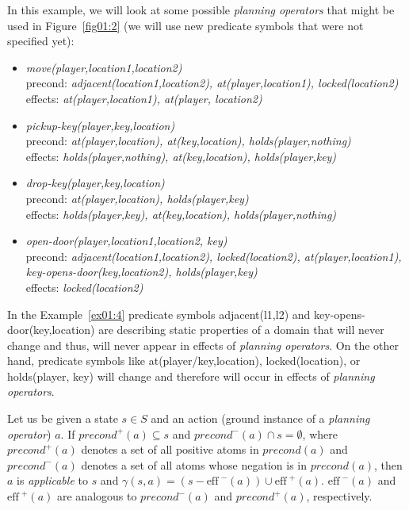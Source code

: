 \begin{example}\label{ex01:4}
    In this example, we will look at some possible \emph{planning operators} that might be used in Figure~\ref{fig01:2} (we will use new predicate symbols that were not specified yet):

    \begin{itemize}
        \item \emph{move(player,location1,location2)} \\
        precond: \emph{adjacent(location1,location2), at(player,location1), \neg locked(location2)} \\
        effects: \emph{\neg at(player,location1), at(player, location2)}

        \item \emph{pickup-key(player,key,location)} \\
        precond: \emph{at(player,location), at(key,location), holds(player,nothing)} \\
        effects: \emph{\neg holds(player,nothing), \neg at(key,location), holds(player,key)}

        \item \emph{drop-key(player,key,location)} \\
        precond: \emph{at(player,location), holds(player,key)} \\
        effects: \emph{\neg holds(player,key), at(key,location), holds(player,nothing)}

        \item \emph{open-door(player,location1,location2, key)} \\
        precond: \emph{adjacent(location1,location2), locked(location2), at(player,location1), key-opens-door(key,location2), holds(player,key)} \\
        effects: \emph{\neg locked(location2)}
    \end{itemize}
\end{example}

\medskip\noindent
In the Example~\ref{ex01:4} predicate symbols adjacent(l1,l2) and key-opens-door(key,location) are describing static properties of a domain that will never change and thus, will never appear in effects of \emph{planning operators}. On the other hand, predicate symbols like at(player/key,location), locked(location), or holds(player, key) will change and therefore will occur in effects of \emph{planning operators}.

\begin{defn}\label{def01:6}
Let us be given a state $s \in S$ and an action (ground instance of a \emph{planning operator}) $a$. If $precond^{+}(a) \subseteq s$ and $precond^{-}(a) \cap s = \emptyset$, where $precond^{+}(a)$ denotes a set of all positive atoms in $precond(a)$ and $precond^{-}(a)$ denotes a set of all atoms whose negation is in $precond(a)$, then $a$ is \emph{applicable} to $s$ and $\gamma(s,a)=(s-\text{eff}^{\,\,-}(a)) \cup \text{eff}^{\,\,+}(a)$. $\text{eff}^{\,\,-}(a)$ and $\text{eff}^{\,\,+}(a)$ are analogous to $precond^{-}(a)$ and $precond^{+}(a)$, respectively.
\end{defn}

